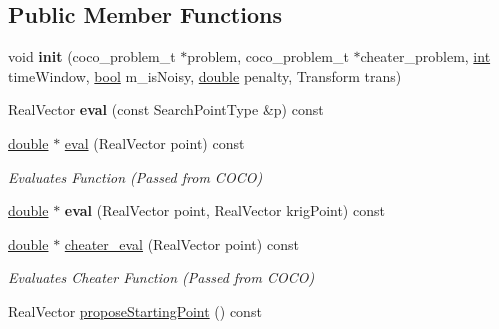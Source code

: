 \subsection*{Public Member Functions}
\begin{DoxyCompactItemize}
\item 
void {\bfseries init} (coco\+\_\+problem\+\_\+t $\ast$problem, coco\+\_\+problem\+\_\+t $\ast$cheater\+\_\+problem, \hyperlink{classint}{int} time\+Window, \hyperlink{classbool}{bool} m\+\_\+is\+Noisy, \hyperlink{classdouble}{double} penalty, Transform trans)\hypertarget{classCOCOfunc__m_ab2f78579bc03e3b8e52ef94da034052e}{}\label{classCOCOfunc__m_ab2f78579bc03e3b8e52ef94da034052e}

\item 
Real\+Vector {\bfseries eval} (const Search\+Point\+Type \&p) const \hypertarget{classCOCOfunc__m_a15f635882119db563828d26d4f56bcfb}{}\label{classCOCOfunc__m_a15f635882119db563828d26d4f56bcfb}

\item 
\hyperlink{classdouble}{double} $\ast$ \hyperlink{classCOCOfunc_af59cef4f0a78c07c4910bf015363c3f5}{eval} (Real\+Vector point) const
\begin{DoxyCompactList}\small\item\em Evaluates Function (Passed from C\+O\+CO) \end{DoxyCompactList}\item 
\hyperlink{classdouble}{double} $\ast$ {\bfseries eval} (Real\+Vector point, Real\+Vector krig\+Point) const\hypertarget{classCOCOfunc_a5212e78af436dfe41259bf21217cb80b}{}\label{classCOCOfunc_a5212e78af436dfe41259bf21217cb80b}

\item 
\hyperlink{classdouble}{double} $\ast$ \hyperlink{classCOCOfunc_aaf37b734aed084757a8ccf5ad4d66705}{cheater\+\_\+eval} (Real\+Vector point) const
\begin{DoxyCompactList}\small\item\em Evaluates Cheater Function (Passed from C\+O\+CO) \end{DoxyCompactList}\item 
Real\+Vector \hyperlink{classCOCOfunc_a2a5d8bccb6235159b8f28be24c989d07}{propose\+Starting\+Point} () const\hypertarget{classCOCOfunc_a2a5d8bccb6235159b8f28be24c989d07}{}\label{classCOCOfunc_a2a5d8bccb6235159b8f28be24c989d07}


\end{DoxyCompactItemize}
